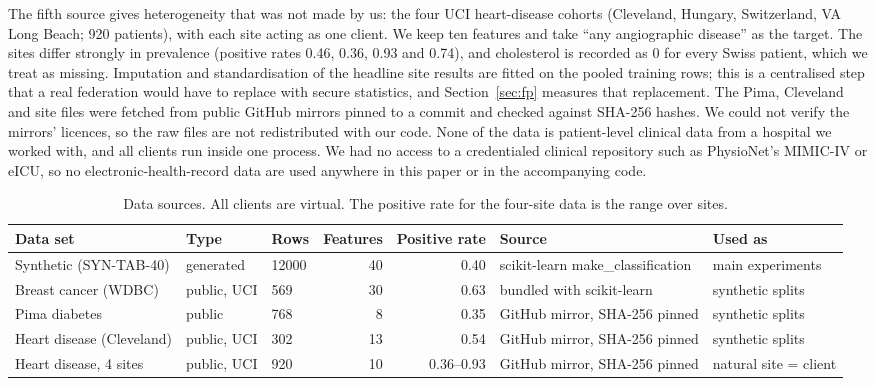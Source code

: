 \documentclass[conference]{IEEEtran}
\begin{document}
The fifth source gives heterogeneity that was not made by us: the four UCI heart-disease cohorts (Cleveland, Hungary, Switzerland, VA Long Beach; 920 patients), with each site acting as one client. We keep ten features and take ``any angiographic disease'' as the target. The sites differ strongly in prevalence (positive rates 0.46, 0.36, 0.93 and 0.74), and cholesterol is recorded as 0 for every Swiss patient, which we treat as missing. Imputation and standardisation of the headline site results are fitted on the pooled training rows; this is a centralised step that a real federation would have to replace with secure statistics, and Section~\ref{sec:fp} measures that replacement. The Pima, Cleveland and site files were fetched from public GitHub mirrors pinned to a commit and checked against SHA-256 hashes. We could not verify the mirrors' licences, so the raw files are not redistributed with our code. None of the data is patient-level clinical data from a hospital we worked with, and all clients run inside one process. We had no access to a credentialed clinical repository such as PhysioNet's MIMIC-IV or eICU, so no electronic-health-record data are used anywhere in this paper or in the accompanying code.
\begin{table}[t]\centering\caption{Data sources. All clients are virtual. The positive rate for the four-site data is the range over sites.}\label{t:data}\scriptsize
\begin{tabular}{lllrrll}\toprule
Data set & Type & Rows & Features & Positive rate & Source & Used as \\\midrule
Synthetic (SYN-TAB-40) & generated & 12000 & 40 & 0.40 & scikit-learn make\_classification & main experiments \\
Breast cancer (WDBC) & public, UCI & 569 & 30 & 0.63 & bundled with scikit-learn & synthetic splits \\
Pima diabetes & public & 768 & 8 & 0.35 & GitHub mirror, SHA-256 pinned & synthetic splits \\
Heart disease (Cleveland) & public, UCI & 302 & 13 & 0.54 & GitHub mirror, SHA-256 pinned & synthetic splits \\
Heart disease, 4 sites & public, UCI & 920 & 10 & 0.36--0.93 & GitHub mirror, SHA-256 pinned & natural site = client \\\bottomrule\end{tabular}\end{table}
\end{document}
